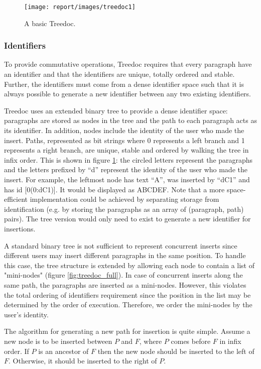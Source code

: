 \documentclass[twocolumn]{article}
\begin{document}
\begin{figure}[tbh!]
  \centering
  \texttt{[image: report/images/treedoc1]}
  \caption{A basic Treedoc.\label{fig:treedoc_basic}}
\end{figure}

\subsubsection{Identifiers}
To provide commutative operations, Treedoc requires that every paragraph have an identifier and that the identifiers are unique, totally ordered and stable. Further, the identifiers must come from a dense identifier space such that it is always possible to generate a new identifier between any two existing identifiers.

Treedoc uses an extended binary tree to provide a dense identifier space: paragraphs are stored as nodes in the tree and the path to each paragraph acts as its identifier. In addition, nodes include the identity of the user who made the insert. Paths, represented as bit strings where 0 represents a left branch and 1 represents a right branch, are unique, stable and ordered by walking the tree in infix order. This is shown in figure \ref{fig:treedoc_basic}: the circled letters represent the paragraphs and the letters prefixed by “d” represent the identity of the user who made the insert. For example, the leftmost node has text “A”, was inserted by “dC1” and has id [0(0:dC1)]. It would be displayed as ABCDEF. Note that a more space-efficient implementation could be achieved by separating storage from identification (e.g. by storing the paragraphs as an array of (paragraph, path) pairs). The tree version would only need to exist to generate a new identifier for insertions.

A standard binary tree is not sufficient to represent concurrent inserts since different users may insert different paragraphs in the same position. To handle this case, the tree structure is extended by allowing each node to contain a list of "mini-nodes" (figure \ref{fig:treedoc_full}). In case of concurrent inserts along the same path, the paragraphs are inserted as a mini-nodes. However, this violates the total ordering of identifiers requirement since the position in the list may be determined by the order of execution. Therefore, we order the mini-nodes by the user's identity.

The algorithm for generating a new path for insertion is quite simple. Assume a new node is to be inserted between $P$ and $F$, where $P$ comes before $F$ in infix order. If $P$ is an ancestor of $F$ then the new node should be inserted to the left of $F$. Otherwise, it should be inserted to the right of $P$.
\end{document}
